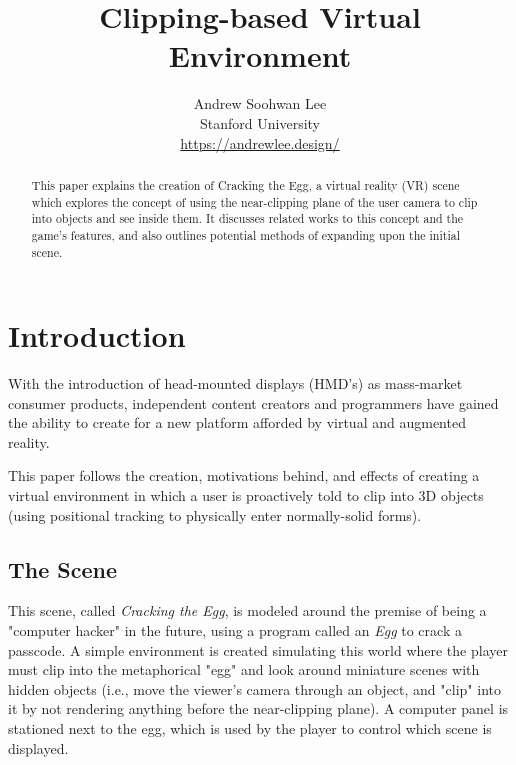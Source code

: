 \documentclass[10pt,twocolumn,letterpaper]{article}
\begin{document}
\title{Clipping-based Virtual Environment}

\author{Andrew Soohwan Lee\\
Stanford University\\
{\small\url{https://andrewlee.design/}}
}

\maketitle
\thispagestyle{empty}

\begin{abstract}
This paper explains the creation of \textnormal{Cracking the Egg}, a virtual reality (VR) scene which explores the concept of using the near-clipping plane of the user camera to clip into objects and see inside them. It discusses related works to this concept and the game's features, and also outlines potential methods of expanding upon the initial scene.\\
\end{abstract}

\section{Introduction} \label{introduction}

With the introduction of head-mounted displays (HMD's) as mass-market consumer products, independent content creators and programmers have gained the ability to create for a new platform afforded by virtual and augmented reality.

This paper follows the creation, motivations behind, and effects of creating a virtual environment in which a user is proactively told to clip into 3D objects (using positional tracking to physically enter normally-solid forms).

\subsection{The Scene}

This scene, called \textit{Cracking the Egg}, is modeled around the premise of being a "computer hacker" in the future, using a program called an \textit{Egg} to crack a passcode. A simple environment is created simulating this world where the player must clip into the metaphorical "egg" and look around miniature scenes with hidden objects (i.e., move the viewer's camera through an object, and "clip" into it by not rendering anything before the near-clipping plane). A computer panel is stationed next to the egg, which is used by the player to control which scene is displayed.
\end{document}
